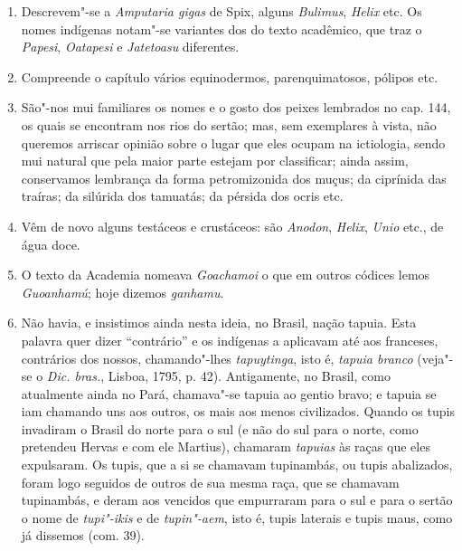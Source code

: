 \begin{enumerate}
\item Descrevem"-se a \textit{Amputaria gigas} de Spix, alguns \textit{Bulimus}, \textit{Helix} etc. Os nomes 
indígenas notam"-se variantes dos do texto acadêmico, que traz o \textit{Papesi}, \textit{Oatapesi} e 
\textit{Jatetoasu} diferentes.

\item Compreende o capítulo vários equinodermos, parenquimatosos, pólipos etc.

\item São"-nos mui familiares os nomes e o gosto dos peixes lembrados no cap. 144, os 
quais se encontram nos rios do sertão; mas, sem exemplares à vista, não queremos 
arriscar opinião sobre o lugar que eles ocupam na ictiologia, sendo mui natural que pela 
maior parte estejam por classificar; ainda assim, conservamos lembrança da forma 
petromizonida dos muçus; da ciprínida das traíras; da silúrida dos tamuatás; da pérsida 
dos ocris etc.

\item Vêm de novo alguns testáceos e crustáceos: são \textit{Anodon}, \textit{Helix}, \textit{Unio} etc., de água 
doce.

\item O texto da Academia nomeava \textit{Goachamoi} o que em outros códices lemos 
\textit{Guoanhamú}; hoje dizemos \textit{ganhamu}.

\item Não havia, e insistimos ainda nesta ideia, no Brasil, nação tapuia. Esta palavra 
quer dizer ``contrário'' e os indígenas a aplicavam até aos franceses, contrários dos 
nossos, chamando"-lhes \textit{tapuytinga}, isto é, \textit{tapuia branco} (veja"-se o \textit{Dic. bras.}, Lisboa, 
1795, p. 42). Antigamente, no Brasil, como atualmente ainda no Pará, chamava"-se 
tapuia ao gentio bravo; e tapuia se iam chamando uns aos outros, os mais aos menos 
civilizados. Quando os tupis invadiram o Brasil do norte para o sul (e não do sul para o 
norte, como pretendeu Hervas e com ele Martius), chamaram \textit{tapuias} às raças que eles 
expulsaram. Os tupis, que a si se chamavam tupinambás, ou tupis abalizados, foram 
logo seguidos de outros de sua mesma raça, que se chamavam tupinambás, e deram aos 
vencidos que empurraram para o sul e para o sertão o nome de \textit{tupi"-ikis} e de \textit{tupin"-aem}, 
isto é, tupis laterais e tupis maus, como já dissemos (com. 39).


\end{enumerate}
